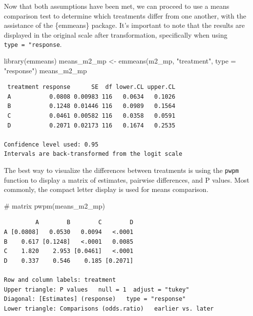 \documentclass[
  letterpaper,
]{book}
\newenvironment{Shaded}{\begin{snugshade}}{\end{snugshade}}
\newcommand{\AttributeTok}[1]{\textcolor[rgb]{0.40,0.45,0.13}{#1}}
\newcommand{\CommentTok}[1]{\textcolor[rgb]{0.37,0.37,0.37}{#1}}
\newcommand{\FunctionTok}[1]{\textcolor[rgb]{0.28,0.35,0.67}{#1}}
\newcommand{\NormalTok}[1]{\textcolor[rgb]{0.00,0.23,0.31}{#1}}
\newcommand{\OtherTok}[1]{\textcolor[rgb]{0.00,0.23,0.31}{#1}}
\newcommand{\StringTok}[1]{\textcolor[rgb]{0.13,0.47,0.30}{#1}}
\begin{document}
Now that both assumptions have been met, we can proceed to use a means
comparison test to determine which treatments differ from one another,
with the assistance of the \{emmeans\} package. It's important to note
that the results are displayed in the original scale after
transformation, specifically when using \texttt{type\ =\ "response}.

\begin{Shaded}
\begin{Highlighting}[]
\FunctionTok{library}\NormalTok{(emmeans)}
\NormalTok{means\_m2\_mp }\OtherTok{\textless{}{-}} \FunctionTok{emmeans}\NormalTok{(m2\_mp, }\StringTok{"treatment"}\NormalTok{, }\AttributeTok{type =} \StringTok{"response"}\NormalTok{)}
\NormalTok{means\_m2\_mp}
\end{Highlighting}
\end{Shaded}

\begin{verbatim}
 treatment response      SE  df lower.CL upper.CL
 A           0.0808 0.00983 116   0.0634   0.1026
 B           0.1248 0.01446 116   0.0989   0.1564
 C           0.0461 0.00582 116   0.0358   0.0591
 D           0.2071 0.02173 116   0.1674   0.2535

Confidence level used: 0.95 
Intervals are back-transformed from the logit scale 
\end{verbatim}

The best way to visualize the differences between treatments is using
the \texttt{pwpm} function to display a matrix of estimates, pairwise
differences, and P values. Most commonly, the compact letter display is
used for means comparison.

\begin{Shaded}
\begin{Highlighting}[]
\CommentTok{\# matrix}
\FunctionTok{pwpm}\NormalTok{(means\_m2\_mp)}
\end{Highlighting}
\end{Shaded}

\begin{verbatim}
         A        B        C        D
A [0.0808]   0.0530   0.0094   <.0001
B    0.617 [0.1248]   <.0001   0.0085
C    1.820    2.953 [0.0461]   <.0001
D    0.337    0.546    0.185 [0.2071]

Row and column labels: treatment
Upper triangle: P values   null = 1  adjust = "tukey"
Diagonal: [Estimates] (response)   type = "response"
Lower triangle: Comparisons (odds.ratio)   earlier vs. later
\end{verbatim}
\end{document}

